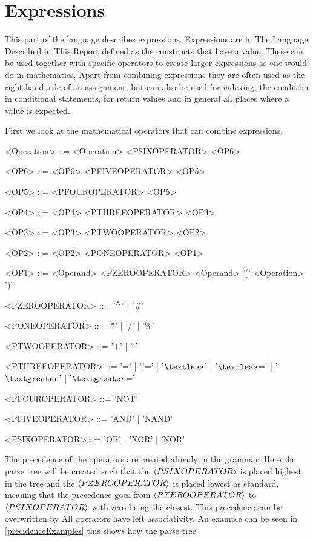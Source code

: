 \section{Expressions}
\label{sec:Expressions}
This part of the language describes expressions. Expressions are in The Language Described in This Report defined as the constructs that have a value. These can be used together with specific operators to create larger expressions as one would do in mathematics. Apart from combining expressions they are often used as the right hand side of an assignment, but can also be used for indexing, the condition in conditional statements, for return values and in general all places where a value is expected.

First we look at the mathematical operators that can combine expressions.
\setlength{\grammarindent}{100pt}
\begin{grammar}
<Operation> ::= <Operation> <PSIXOPERATOR> <OP6>

<OP6> ::= <OP6> <PFIVEOPERATOR> <OP5>

<OP5> ::= <PFOUROPERATOR> <OP5>

<OP4> ::= <OP4> <PTHREEOPERATOR> <OP3>

<OP3> ::= <OP3> <PTWOOPERATOR> <OP2>

<OP2> ::= <OP2> <PONEOPERATOR> <OP1>

<OP1> ::= <Operand>
  <PZEROOPERATOR> <Operand>
 \alt '(' <Operation> ')'

<PZEROOPERATOR> ::= '$\mathbin{^\wedge{}}$' | '\#'

<PONEOPERATOR> ::= '*' | '/' | '\%'

<PTWOOPERATOR> ::= '+' | '-'

<PTHREEOPERATOR> ::= '=' | '!=' | '$\textless$' | '$\textless$=' | '$\textgreater$' | '$\textgreater$='

<PFOUROPERATOR> ::= 'NOT'

<PFIVEOPERATOR> ::= 'AND' | 'NAND'

<PSIXOPERATOR> ::= 'OR' | 'XOR' | 'NOR'
\end{grammar}
The precedence of the operators are created already in the grammar. Here the parse tree will be created such that the $\braket{PSIXOPERATOR}$ is placed highest in the tree and the $\braket{PZEROOPERATOR}$ is placed lowest as standard, meaning that the precedence goes from $\braket{PZEROOPERATOR}$ to $\braket{PSIXOPERATOR}$ with zero being the closest. This precedence can be overwritten by  All operators have left associativity. An example can be seen in \cref{precidenceExamples} this shows how the parse tree

